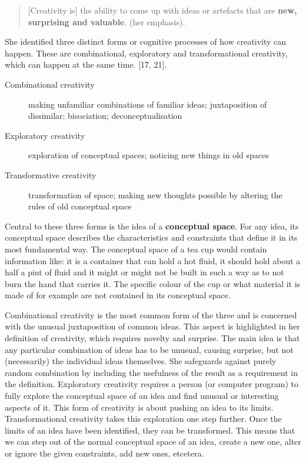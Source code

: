 \begin{quote}
  [Creativity is] the ability to come up with ideas or artefacts that are \textbf{new, surprising and valuable}. \citep{Boden2003} (her emphasis).
\end{quote}

She identified three distinct forms or cognitive processes of how creativity can happen. These are combinational, exploratory and transformational creativity, which can happen at the same time. \citep{Boden2003}[17, 21].

\begin{description}
  \item [Combinational creativity] making unfamiliar combinations of familiar ideas; juxtaposition of dissimilar; bisociation; deconceptualisation
  \item [Exploratory creativity] exploration of conceptual spaces; noticing new things in old spaces
  \item [Transformative creativity] transformation of space; making new thoughts possible by altering the rules of old conceptual space
\end{description}

Central to these three forms is the idea of a \textbf{conceptual space}. For any idea, its conceptual space describes the characteristics and constraints that define it in its most fundamental way. The conceptual space of a tea cup would contain information like: it is a container that can hold a hot fluid, it should hold about a half a pint of fluid and it might or might not be built in such a way as to not burn the hand that carries it. The specific colour of the cup or what material it is made of for example are not contained in its conceptual space.

Combinational creativity is the most common form of the three and is concerned with the unusual juxtaposition of common ideas. This aspect is highlighted in her definition of creativity, which requires novelty and surprise. The main idea is that any particular combination of ideas has to be unusual, causing surprise, but not (necessarily) the individual ideas themselves. She safeguards against purely random combination by including the usefulness of the result as a requirement in the definition. Exploratory creativity requires a person (or computer program) to fully explore the conceptual space of an idea and find unusual or interesting aspects of it. This form of creativity is about pushing an idea to its limits. Transformational creativity takes this exploration one step further. Once the limits of an idea have been identified, they can be transformed. This means that we can step out of the normal conceptual space of an idea, create a new one, alter or ignore the given constraints, add new ones, etcetera.

